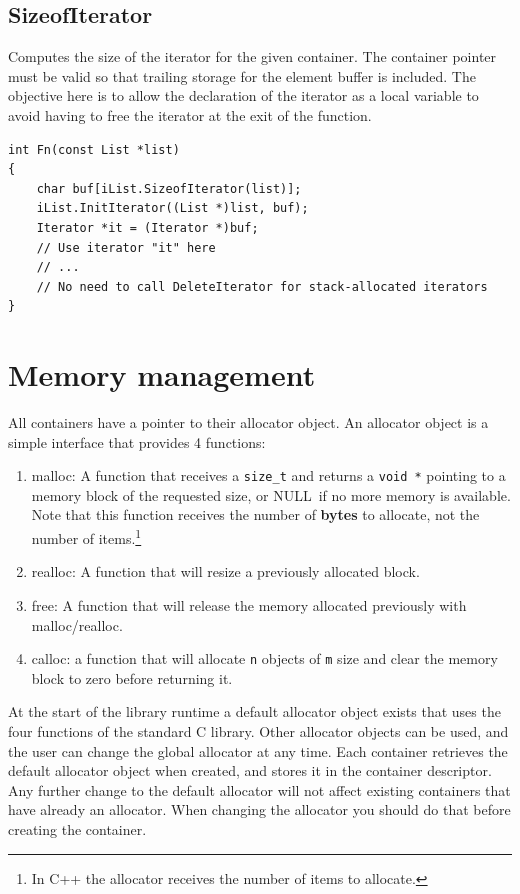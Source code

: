 \documentclass[12pt,a4paper,openany]{memoir} %
\newif\iftth
\newcommand{\Null}{{\iftth \ NULL \else \footnotesize NULL\  \fi}}
\begin{document}
\subsection{SizeofIterator}
Computes the size of the iterator for the given container. The container pointer must be valid so that trailing storage for the element buffer is included. The objective here is to allow the declaration of the iterator as a local variable to avoid having to free the iterator at the exit of the function.
\begin{verbatim}
int Fn(const List *list)
{
    char buf[iList.SizeofIterator(list)];
    iList.InitIterator((List *)list, buf);
    Iterator *it = (Iterator *)buf;
    // Use iterator "it" here
    // ...
    // No need to call DeleteIterator for stack-allocated iterators
}
\end{verbatim}

\section{Memory management}
All containers have a pointer to their allocator object. An allocator object is a simple interface that provides 4 functions:
\begin{enumerate}
\item malloc: A function that receives a \texttt{size\_t} and returns a \texttt{void *} pointing to a memory block of the requested size, or \Null if no more memory is available. Note that this function receives the number of \textbf{bytes} to allocate, not the number of items.\footnote{In C++ the allocator receives the number of items to allocate.}
\item realloc: A function that will resize a previously allocated block.
\item free: A function that will release the memory allocated previously with malloc/realloc.
\item calloc: a function that will allocate \verb,n, objects of \verb,m, size and clear the memory block to zero before returning it. 
\end{enumerate}
At the start of the library runtime a default allocator object exists that uses the four functions of the standard C library. Other allocator objects can be used, and the user can change the global allocator at any time. Each container retrieves the default allocator object when created, and stores it in the container descriptor. Any further change to the default allocator will not affect existing containers that have already an allocator. When changing the allocator you should do that before creating the container.
 
\end{document}
